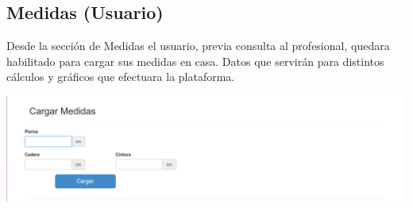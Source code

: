 \documentclass[runningheads,a4paper,spanish]{llncs}
\begin{document}
\subsection{Medidas (Usuario)}
Desde la sección de Medidas el usuario, previa consulta al profesional, quedara habilitado para cargar sus medidas en casa. Datos que servirán para distintos cálculos y gráficos que efectuara la plataforma.
\begin{center}
	\includegraphics[scale=0.3]{carga_medidas_usuario.png}
\end{center}
\end{document}
